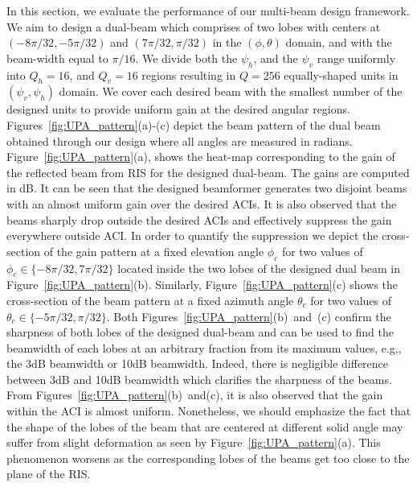 In this section, we evaluate the performance of our multi-beam design framework. We aim to design a dual-beam  which comprises of two lobes with centers at $(-8\pi/32, -5 \pi /32)$ and $(7\pi/32, \pi /32)$ in the $(\phi, \theta)$ domain, and with the beam-width equal to $\pi /16$. We divide both the $\psi_h$, and the $\psi_v$ range uniformly into $Q_h = 16$, and $Q_v = 16$ regions resulting in $Q = 256$ equally-shaped units in $(\psi_v, \psi_h)$ domain. We cover each desired beam with the smallest number of the designed units to provide uniform gain at the desired angular regions.
Figures~\ref{fig:UPA_pattern}(a)-(c) depict the beam pattern of the dual beam obtained through our design where all angles are measured in radians. 
Figure~\ref{fig:UPA_pattern}(a), shows the heat-map corresponding to the gain of the reflected beam from RIS for the designed dual-beam. The gains are computed in dB. It can be seen that the designed beamformer generates two disjoint beams with an almost uniform gain over the desired ACIs. It is also observed that the beams sharply drop outside the desired ACIs and effectively suppress the gain everywhere outside ACI. In order to quantify the suppression we depict the cross-section of the gain pattern at a fixed elevation angle $\phi_c$ for two values of $\phi_c \in \{-8\pi/32, 7\pi/32\}$ located inside the two lobes of the designed dual beam in Figure~\ref{fig:UPA_pattern}(b). Similarly, Figure~\ref{fig:UPA_pattern}(c) shows the cross-section of the beam pattern at a fixed azimuth angle $\theta_c$ for two values of $\theta_c \in \{ -5 \pi /32, \pi /32\}$. Both Figures~\ref{fig:UPA_pattern}(b)~and~(c) confirm the sharpness of both lobes of the designed dual-beam and can be used to find the beamwidth of each lobes at an arbitrary fraction from its maximum values, e.g,, the 3dB beamwidth or 10dB beamwidth. Indeed, there is negligible difference between 3dB and 10dB beamwidth which clarifies the sharpness of the beams. From Figures~\ref{fig:UPA_pattern}(b)~and(c), it is also observed that the gain within the ACI is almost uniform. Nonetheless, we should emphasize the fact that the shape of the lobes of the beam that are centered at different solid angle may suffer from slight deformation as seen by Figure~\ref{fig:UPA_pattern}(a). This phenomenon worsens as the corresponding lobes of the beams get too close to the plane of the RIS. 

